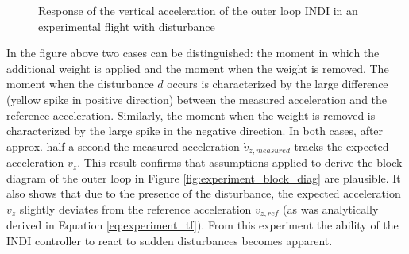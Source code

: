 \documentclass[11pt, a4paper, twoside]{report}
\begin{document}
\begin{figure}[H]
	\centering 
	\captionsetup{justification=centering, singlelinecheck=off, font=bf, belowskip=-0.5cm}
	\caption[Response of the vertical acceleration of the outer loop \acrshort{INDI}]{Response of the vertical acceleration of the outer loop \acrshort{INDI} in an experimental flight with disturbance}
	\label{fig:experiment_plot}
\end{figure}

In the figure above two cases can be distinguished: the moment in which the additional weight is applied and the moment when the weight is removed. The moment when the disturbance $d$ occurs is characterized by the large difference (yellow spike in positive direction) between the measured acceleration and the reference acceleration. Similarly, the moment when the weight is removed is characterized by the large spike in the negative direction. In both cases, after approx. half a second the measured acceleration $\dot{v}_{z,measured}$ tracks the expected acceleration $\dot{v}_{z}$. This result confirms that assumptions applied to derive the block diagram of the outer loop in Figure \ref{fig:experiment_block_diag} are plausible. It also shows that due to the presence of the disturbance, the expected acceleration $\dot{v}_{z}$ slightly deviates from the reference acceleration $\dot{v}_{z,ref}$ (as was analytically derived in Equation \ref{eq:experiment_tf}). From this experiment the ability of the \acrshort{INDI} controller to react to sudden disturbances becomes apparent. 
\end{document}
